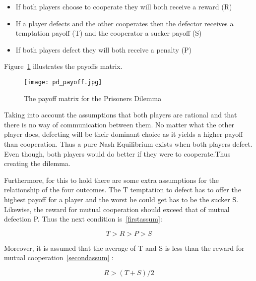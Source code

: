 \begin{itemize}
  \item If both players choose to cooperate they will both receive a reward (R)
  \item If a player defects and the other cooperates then the defector receives
  a temptation payoff (T) and the cooperator a sucker payoff (S)
  \item If both players defect they will both receive a penalty (P)
\end{itemize}

Figure~\ref{fig:pd_payoff} illustrates the payoffs matrix.

\begin{figure}[h!]
    \centering
    \texttt{[image: pd\_payoff.jpg]}
    \caption{The payoff matrix for the Prisoners Dilemma}
    \label{fig:pd_payoff}
\end{figure}

Taking into account the assumptions that both players are rational
and that there is no way of communication between them. No matter what the
other player does, defecting will be their dominant choice as it yields a higher
payoff than cooperation.
Thus a pure Nash Equilibrium exists when both players defect. Even though, both
players would do better if they were to cooperate.Thus creating the dilemma.

Furthermore, for this to hold there are some extra assumptions for the
relationship of the four outcomes. The T temptation to defect has to offer the
highest payoff for a player and the worst he could get has to be the sucker S.
Likewise, the reward for mutual cooperation should exceed that of mutual
defection P. Thus the next condition is~\ref{firstassum}:

\begin{equation}\label{firstassum}
 T > R > P > S
\end{equation}

Moreover, it is assumed that the average of T and S is less than the reward for
mutual cooperation~\ref{secondassum} :

\begin{equation}\label{secondassum}
    R > (T+S)/2
\end{equation}

